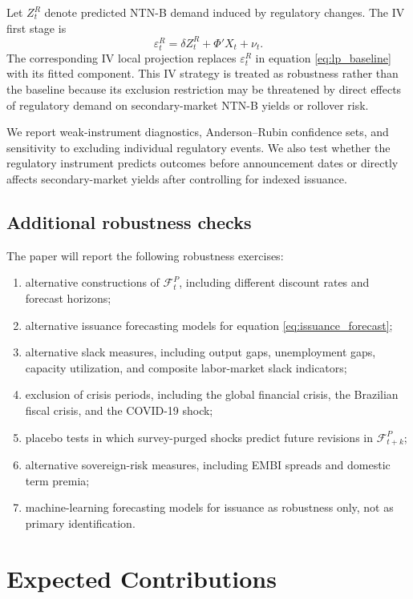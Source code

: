 \documentclass[12pt,a4paper]{article}
\begin{document}
Let \(Z_t^R\) denote predicted NTN-B demand induced by regulatory changes. The IV first stage is
\begin{equation}
\varepsilon_t^R
=
\delta Z_t^R
+
\Phi'X_t
+
\nu_t.
\end{equation}
The corresponding IV local projection replaces \(\varepsilon_t^R\) in equation \eqref{eq:lp_baseline} with its fitted component. This IV strategy is treated as robustness rather than the baseline because its exclusion restriction may be threatened by direct effects of regulatory demand on secondary-market NTN-B yields or rollover risk.

We report weak-instrument diagnostics, Anderson--Rubin confidence sets, and sensitivity to excluding individual regulatory events. We also test whether the regulatory instrument predicts outcomes before announcement dates or directly affects secondary-market yields after controlling for indexed issuance.

\subsection{Additional robustness checks}

The paper will report the following robustness exercises:
\begin{enumerate}[leftmargin=1.2cm]
    \item alternative constructions of \(\mathcal{F}_t^P\), including different discount rates and forecast horizons;
    \item alternative issuance forecasting models for equation \eqref{eq:issuance_forecast};
    \item alternative slack measures, including output gaps, unemployment gaps, capacity utilization, and composite labor-market slack indicators;
    \item exclusion of crisis periods, including the global financial crisis, the Brazilian fiscal crisis, and the COVID-19 shock;
    \item placebo tests in which survey-purged shocks predict future revisions in \(\mathcal{F}_{t+k}^{P}\);
    \item alternative sovereign-risk measures, including EMBI spreads and domestic term premia;
    \item machine-learning forecasting models for issuance as robustness only, not as primary identification.
\end{enumerate}

\section{Expected Contributions}
\end{document}
